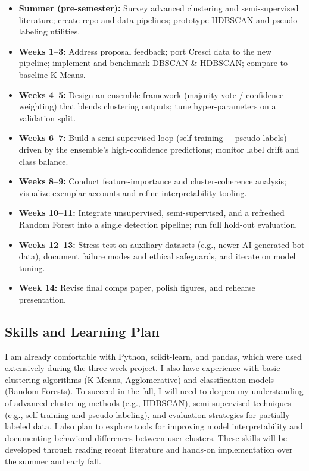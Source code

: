 \documentclass[10pt,twocolumn]{article}
\begin{document}
\begin{itemize}
    \item \textbf{Summer (pre-semester):}  Survey advanced clustering and semi-supervised literature; create repo and data pipelines; prototype HDBSCAN and pseudo-labeling utilities.

    \item \textbf{Weeks 1--3:} Address proposal feedback; port Cresci data to the new pipeline; implement and benchmark DBSCAN \& HDBSCAN; compare to baseline K-Means.

    \item \textbf{Weeks 4--5:} Design an ensemble framework (majority vote / confidence weighting) that blends clustering outputs; tune hyper-parameters on a validation split.

    \item \textbf{Weeks 6--7:} Build a semi-supervised loop (self-training + pseudo-labels) driven by the ensemble’s high-confidence predictions; monitor label drift and class balance.

    \item \textbf{Weeks 8--9:} Conduct feature-importance and cluster-coherence analysis; visualize exemplar accounts and refine interpretability tooling.

    \item \textbf{Weeks 10--11:} Integrate unsupervised, semi-supervised, and a refreshed Random Forest into a single detection pipeline; run full hold-out evaluation.

    \item \textbf{Weeks 12--13:} Stress-test on auxiliary datasets (e.g., newer AI-generated bot data), document failure modes and ethical safeguards, and iterate on model tuning.

    \item \textbf{Week 14:} Revise final comps paper, polish figures, and rehearse presentation.
\end{itemize}


\subsection{Skills and Learning Plan}

I am already comfortable with Python, scikit-learn, and pandas, which were used extensively during the three-week project. I also have experience with basic clustering algorithms (K-Means, Agglomerative) and classification models (Random Forests). To succeed in the fall, I will need to deepen my understanding of advanced clustering methods (e.g., HDBSCAN), semi-supervised techniques (e.g., self-training and pseudo-labeling), and evaluation strategies for partially labeled data. I also plan to explore tools for improving model interpretability and documenting behavioral differences between user clusters. These skills will be developed through reading recent literature and hands-on implementation over the summer and early fall.
\end{document}
